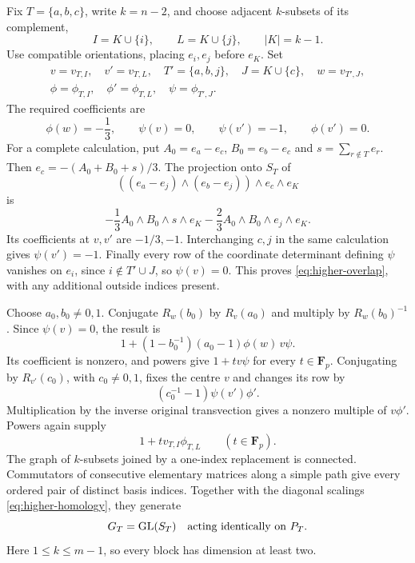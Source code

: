 Fix $T=\{a,b,c\}$, write $k=n-2$, and choose adjacent $k$-subsets of its complement,
\[
I=K\cup\{i\},\qquad L=K\cup\{j\},\qquad |K|=k-1.
\]
Use compatible orientations, placing $e_i,e_j$ before $e_K$. Set
\[
\begin{gathered}
v=v_{T,I},\quad v'=v_{T,L},\quad
T'=\{a,b,j\},\quad J=K\cup\{c\},\quad w=v_{T',J},\\
\phi=\phi_{T,I},\quad\phi'=\phi_{T,L},\quad\psi=\phi_{T',J}.
\end{gathered}
\]
The required coefficients are
\begin{equation}\label{eq:higher-overlap}
\phi(w)=-\frac13,\qquad\psi(v)=0,
\qquad\psi(v')=-1,\qquad\phi(v')=0.
\end{equation}
For a complete calculation, put $A_0=e_a-e_c$, $B_0=e_b-e_c$ and $s=\sum_{r\notin T}e_r$. Then $e_c=-(A_0+B_0+s)/3$. The projection onto $S_T$ of
\[
((e_a-e_j)\wedge(e_b-e_j))\wedge e_c\wedge e_K
\]
is
\[
-\frac13 A_0\wedge B_0\wedge s\wedge e_K
-\frac23 A_0\wedge B_0\wedge e_j\wedge e_K.
\]
Its coefficients at $v,v'$ are $-1/3,-1$. Interchanging $c,j$ in the same calculation gives $\psi(v')=-1$. Finally every row of the coordinate determinant defining $\psi$ vanishes on $e_i$, since $i\notin T'\cup J$, so $\psi(v)=0$. This proves \eqref{eq:higher-overlap}, with any additional outside indices present.

Choose $a_0,b_0\ne0,1$. Conjugate $R_w(b_0)$ by $R_v(a_0)$ and multiply by $R_w(b_0)^{-1}$. Since $\psi(v)=0$, the result is
\[
1+(1-b_0^{-1})(a_0-1)\phi(w)\,v\psi.
\]
Its coefficient is nonzero, and powers give $1+t v\psi$ for every $t\in\mathbf F_p$. Conjugating by $R_{v'}(c_0)$, with $c_0\ne0,1$, fixes the centre $v$ and changes its row by
\[
(c_0^{-1}-1)\psi(v')\phi'.
\]
Multiplication by the inverse original transvection gives a nonzero multiple of $v\phi'$. Powers again supply
\begin{equation}\label{eq:higher-elementary}
1+t v_{T,I}\phi_{T,L}\qquad(t\in\mathbf F_p).
\end{equation}
The graph of $k$-subsets joined by a one-index replacement is connected. Commutators of consecutive elementary matrices along a simple path give every ordered pair of distinct basis indices. Together with the diagonal scalings \eqref{eq:higher-homology}, they generate
\begin{equation}\label{eq:higher-full-block}
G_T=\operatorname{GL}(S_T)\quad\hbox{acting identically on }P_T.
\end{equation}
Here $1\le k\le m-1$, so every block has dimension at least two.


